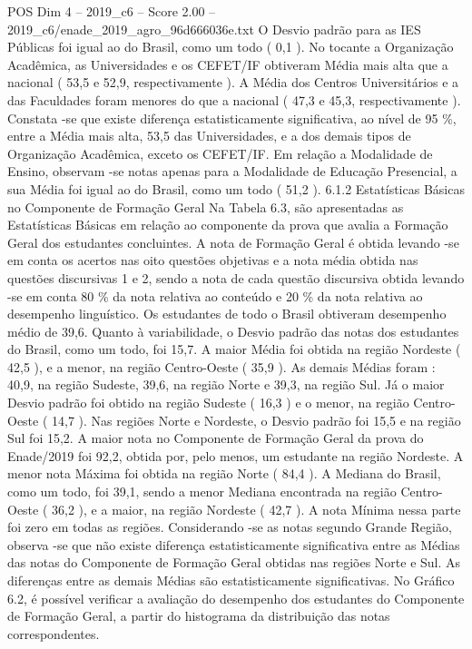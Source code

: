\begin{textsample}{POS Dim 4 – 2019\_c6 – Score 2.00 – 2019\_c6/enade\_2019\_agro\_96d666036e.txt}
O Desvio padrão para as IES Públicas foi igual ao do Brasil, como um todo ( 0,1 ).
No tocante a Organização Acadêmica, as Universidades e os CEFET/IF obtiveram Média mais alta que a nacional ( 53,5 e 52,9, respectivamente ).
A Média dos Centros Universitários e a das Faculdades foram menores do que a nacional ( 47,3 e 45,3, respectivamente ).
Constata -se que existe diferença estatisticamente significativa, ao nível de 95 \%, entre a Média mais alta, 53,5 das Universidades, e a dos demais tipos de Organização Acadêmica, exceto os CEFET/IF.
Em relação a Modalidade de Ensino, observam -se notas apenas para a Modalidade de Educação Presencial, a sua Média foi igual ao do Brasil, como um todo ( 51,2 ). 6.1.2 Estatísticas Básicas no Componente de Formação Geral Na Tabela 6.3, são apresentadas as Estatísticas Básicas em relação ao componente da prova que avalia a Formação Geral dos estudantes concluintes.
A nota de Formação Geral é obtida levando -se em conta os acertos nas oito questões objetivas e a nota média obtida nas questões discursivas 1 e 2, sendo a nota de cada questão discursiva obtida levando -se em conta 80 \% da nota relativa ao conteúdo e 20 \% da nota relativa ao desempenho linguístico.
Os estudantes de todo o Brasil obtiveram desempenho médio de 39,6.
Quanto à variabilidade, o Desvio padrão das notas dos estudantes do Brasil, como um todo, foi 15,7.
A maior Média foi obtida na região Nordeste ( 42,5 ), e a menor, na região Centro-Oeste ( 35,9 ).
As demais Médias foram : 40,9, na região Sudeste, 39,6, na região Norte e 39,3, na região Sul.
Já o maior Desvio padrão foi obtido na região Sudeste ( 16,3 ) e o menor, na região Centro-Oeste ( 14,7 ).
Nas regiões Norte e Nordeste, o Desvio padrão foi 15,5 e na região Sul foi 15,2.
A maior nota no Componente de Formação Geral da prova do Enade/2019 foi 92,2, obtida por, pelo menos, um estudante na região Nordeste.
A menor nota Máxima foi obtida na região Norte ( 84,4 ).
A Mediana do Brasil, como um todo, foi 39,1, sendo a menor Mediana encontrada na região Centro-Oeste ( 36,2 ), e a maior, na região Nordeste ( 42,7 ).
A nota Mínima nessa parte foi zero em todas as regiões.
Considerando -se as notas segundo Grande Região, observa -se que não existe diferença estatisticamente significativa entre as Médias das notas do Componente de Formação Geral obtidas nas regiões Norte e Sul.
As diferenças entre as demais Médias são estatisticamente significativas.
No Gráfico 6.2, é possível verificar a avaliação do desempenho dos estudantes do Componente de Formação Geral, a partir do histograma da distribuição das notas correspondentes.

\end{textsample}
